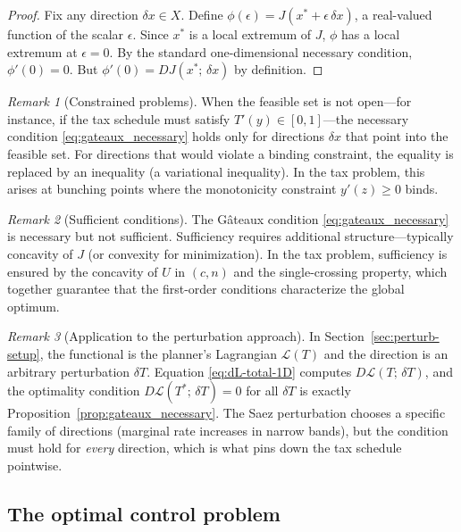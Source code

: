 \documentclass[12pt,a4paper]{article}
\theoremstyle{definition}
\theoremstyle{plain}
\theoremstyle{remark}
\newtheorem{remark}{Remark}[section]
\begin{document}
\begin{proof}
Fix any direction $\delta x \in X$. Define $\phi(\epsilon) = J(x^* + \epsilon\,\delta x)$, a real-valued function of the scalar $\epsilon$. Since $x^*$ is a local extremum of $J$, $\phi$ has a local extremum at $\epsilon = 0$. By the standard one-dimensional necessary condition, $\phi'(0) = 0$. But $\phi'(0) = DJ(x^*;\, \delta x)$ by definition.
\end{proof}

\begin{remark}[Constrained problems]
When the feasible set is not open---for instance, if the tax schedule must satisfy $T'(y) \in [0,1]$---the necessary condition \eqref{eq:gateaux_necessary} holds only for directions $\delta x$ that point into the feasible set. For directions that would violate a binding constraint, the equality is replaced by an inequality (a variational inequality). In the tax problem, this arises at bunching points where the monotonicity constraint $y'(z) \geq 0$ binds.
\end{remark}

\begin{remark}[Sufficient conditions]
The Gâteaux condition \eqref{eq:gateaux_necessary} is necessary but not sufficient. Sufficiency requires additional structure---typically concavity of $J$ (or convexity for minimization). In the tax problem, sufficiency is ensured by the concavity of $U$ in $(c, n)$ and the single-crossing property, which together guarantee that the first-order conditions characterize the global optimum.
\end{remark}

\begin{remark}[Application to the perturbation approach]
In Section~\ref{sec:perturb-setup}, the functional is the planner's Lagrangian $\mathcal{L}(T)$ and the direction is an arbitrary perturbation $\delta T$. Equation \eqref{eq:dL-total-1D} computes $D\mathcal{L}(T;\, \delta T)$, and the optimality condition $D\mathcal{L}(T^*;\, \delta T) = 0$ for all $\delta T$ is exactly Proposition~\ref{prop:gateaux_necessary}. The Saez perturbation chooses a specific family of directions (marginal rate increases in narrow bands), but the condition must hold for \emph{every} direction, which is what pins down the tax schedule pointwise.
\end{remark}

\subsection{The optimal control problem}
\end{document}
